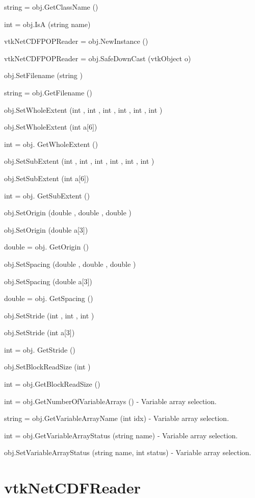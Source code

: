 \begin{DoxyItemize}
\item {\ttfamily string = obj.\-Get\-Class\-Name ()}  
\item {\ttfamily int = obj.\-Is\-A (string name)}  
\item {\ttfamily vtk\-Net\-C\-D\-F\-P\-O\-P\-Reader = obj.\-New\-Instance ()}  
\item {\ttfamily vtk\-Net\-C\-D\-F\-P\-O\-P\-Reader = obj.\-Safe\-Down\-Cast (vtk\-Object o)}  
\item {\ttfamily obj.\-Set\-Filename (string )}  
\item {\ttfamily string = obj.\-Get\-Filename ()}  
\item {\ttfamily obj.\-Set\-Whole\-Extent (int , int , int , int , int , int )}  
\item {\ttfamily obj.\-Set\-Whole\-Extent (int a\mbox{[}6\mbox{]})}  
\item {\ttfamily int = obj. Get\-Whole\-Extent ()}  
\item {\ttfamily obj.\-Set\-Sub\-Extent (int , int , int , int , int , int )}  
\item {\ttfamily obj.\-Set\-Sub\-Extent (int a\mbox{[}6\mbox{]})}  
\item {\ttfamily int = obj. Get\-Sub\-Extent ()}  
\item {\ttfamily obj.\-Set\-Origin (double , double , double )}  
\item {\ttfamily obj.\-Set\-Origin (double a\mbox{[}3\mbox{]})}  
\item {\ttfamily double = obj. Get\-Origin ()}  
\item {\ttfamily obj.\-Set\-Spacing (double , double , double )}  
\item {\ttfamily obj.\-Set\-Spacing (double a\mbox{[}3\mbox{]})}  
\item {\ttfamily double = obj. Get\-Spacing ()}  
\item {\ttfamily obj.\-Set\-Stride (int , int , int )}  
\item {\ttfamily obj.\-Set\-Stride (int a\mbox{[}3\mbox{]})}  
\item {\ttfamily int = obj. Get\-Stride ()}  
\item {\ttfamily obj.\-Set\-Block\-Read\-Size (int )}  
\item {\ttfamily int = obj.\-Get\-Block\-Read\-Size ()}  
\item {\ttfamily int = obj.\-Get\-Number\-Of\-Variable\-Arrays ()} -\/ Variable array selection.  
\item {\ttfamily string = obj.\-Get\-Variable\-Array\-Name (int idx)} -\/ Variable array selection.  
\item {\ttfamily int = obj.\-Get\-Variable\-Array\-Status (string name)} -\/ Variable array selection.  
\item {\ttfamily obj.\-Set\-Variable\-Array\-Status (string name, int status)} -\/ Variable array selection.  
\end{DoxyItemize}\hypertarget{vtkio_vtknetcdfreader}{}\section{vtk\-Net\-C\-D\-F\-Reader}\label{vtkio_vtknetcdfreader}
